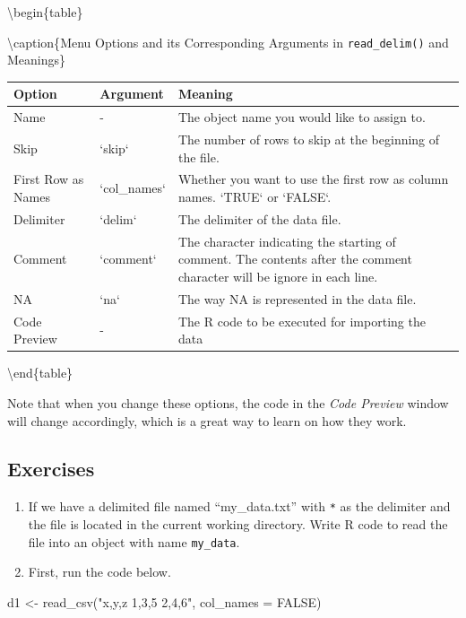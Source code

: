 \documentclass[
]{book}
\newenvironment{Shaded}{\begin{snugshade}}{\end{snugshade}}
\newcommand{\AttributeTok}[1]{\textcolor[rgb]{0.77,0.63,0.00}{#1}}
\newcommand{\ConstantTok}[1]{\textcolor[rgb]{0.00,0.00,0.00}{#1}}
\newcommand{\FunctionTok}[1]{\textcolor[rgb]{0.00,0.00,0.00}{#1}}
\newcommand{\NormalTok}[1]{#1}
\newcommand{\OtherTok}[1]{\textcolor[rgb]{0.56,0.35,0.01}{#1}}
\newcommand{\StringTok}[1]{\textcolor[rgb]{0.31,0.60,0.02}{#1}}
\begin{document}
\textbackslash begin\{table\}

\textbackslash caption\{\label{tab:importOptions}Menu Options and its Corresponding Arguments in \texttt{read\_delim()} and Meanings\}
\centering

\begin{tabular}[t]{l|l|l}
\hline
Option & Argument & Meaning\\
\hline
Name & - & The object name you would like to assign to.\\
\hline
Skip & `skip` & The number of rows to skip at the beginning of the file.\\
\hline
First Row as Names & `col\_names` & Whether you want to use the first row as column names. `TRUE` or `FALSE`.\\
\hline
Delimiter & `delim` & The delimiter of the data file.\\
\hline
Comment & `comment` & The character indicating the starting of comment. The contents after the comment character will be ignore in each line.\\
\hline
NA & `na` & The way NA is represented in the data file.\\
\hline
Code Preview & - & The R code to be executed for importing the data\\
\hline
\end{tabular}

\textbackslash end\{table\}

Note that when you change these options, the code in the \emph{Code Preview} window will change accordingly, which is a great way to learn on how they work.

\hypertarget{exercises-16}{%
\subsection{Exercises}\label{exercises-16}}

\begin{enumerate}
\def\labelenumi{\arabic{enumi}.}
\item
  If we have a delimited file named ``my\_data.txt'' with \texttt{*} as the delimiter and the file is located in the current working directory. Write R code to read the file into an object with name \texttt{my\_data}.
\item
  First, run the code below.
\end{enumerate}

\begin{Shaded}
\begin{Highlighting}[]
\NormalTok{d1 }\OtherTok{\textless{}{-}} \FunctionTok{read\_csv}\NormalTok{(}\StringTok{"x,y,z}
\StringTok{          1,3,5}
\StringTok{          2,4,6"}\NormalTok{, }\AttributeTok{col\_names =} \ConstantTok{FALSE}\NormalTok{)}
\end{Highlighting}
\end{Shaded}
\end{document}
